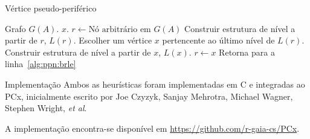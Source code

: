 \documentclass[10pt]{beamer}
\begin{document}
\begin{frame}[fragile]{Vértice pseudo-periférico}
  \begin{algorithmic}[1]
      \REQUIRE Grafo $G(A)$.
      \ENSURE $x$.
      \STATE $r \longleftarrow \text{Nó arbitrário em }G(A)$
      \STATE Construir estrutura de nível a partir de $r$, $L(r)$.
      \label{alg:ppn:brle}
      \STATE Escolher um vértice $x$ pertencente ao último nível de
      $L(r)$.
      \STATE Construir estrutura de nível a partir de $x$, $L(x)$.
          \STATE $r \longleftarrow x$
          \STATE Retorna para a linha~\ref{alg:ppn:brle}
      \ENDIF
  \end{algorithmic}
\end{frame}

\begin{frame}{Implementação}
  Ambos as heurísticas foram implementadas em C e integradas ao PCx,
  inicialmente escrito por Joe Czyzyk, Sanjay Mehrotra, Michael Wagner, Stephen
  Wright, \textit{et al}.

  A implementação encontra-se disponível em
  \url{https://github.com/r-gaia-cs/PCx}.
\end{frame}
\end{document}
